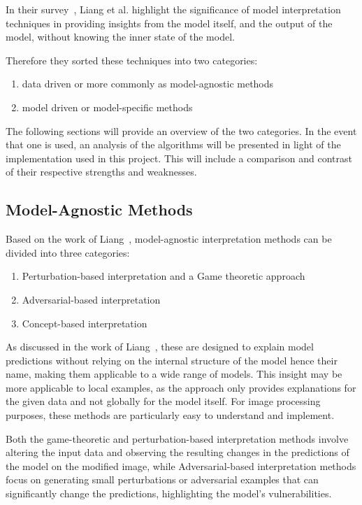 In their survey~\cite{LIANG2021168}, Liang et al. highlight the significance of model interpretation techniques in providing insights from the model itself, and the output of the model, without knowing the inner state of the model.

Therefore they sorted these techniques into two categories:
\begin{enumerate}
    \item data driven or more commonly as model-agnostic methods
    \item model driven or model-specific methods
\end{enumerate}

The following sections will provide an overview of the two categories.
In the event that one is used, an analysis of the algorithms will be presented in light of the implementation used in this project.
This will include a comparison and contrast of their respective strengths and weaknesses.



\subsection{Model-Agnostic Methods}\label{subsec:model-agnostic-methods}
Based on the work of  Liang~\cite{LIANG2021168}, model-agnostic interpretation methods can be divided into three categories:
\begin{enumerate}
    \item Perturbation-based interpretation and a Game theoretic approach
    \item Adversarial-based interpretation
    \item Concept-based interpretation
\end{enumerate}


As discussed in the work of Liang~\cite{LIANG2021168}, these are designed to explain model predictions without relying
on the internal structure of the model hence their name, making them applicable to a wide range of models.
This insight may be more applicable to local examples, as the approach only provides explanations for the given data and not globally for the model itself.
For image processing purposes, these methods are particularly easy to understand and implement.

Both the game-theoretic and perturbation-based interpretation methods involve altering the input data
and observing the resulting changes in the predictions of the model on the modified image, while Adversarial-based interpretation methods focus on generating small perturbations or adversarial examples that can significantly change the predictions, highlighting the model's vulnerabilities.

